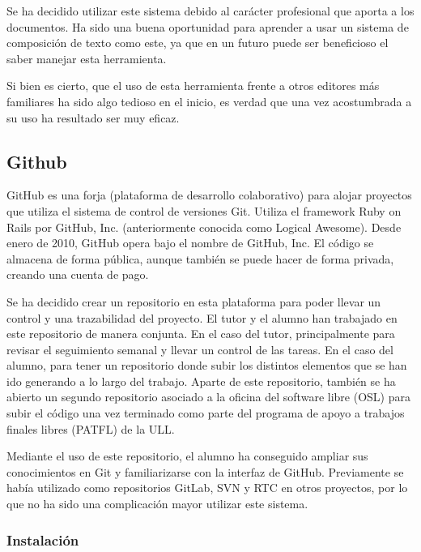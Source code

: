 Se ha decidido utilizar este sistema debido al carácter profesional que aporta a los documentos. Ha sido una buena oportunidad para aprender a usar un sistema de composición de texto como este, ya que en un futuro puede ser beneficioso el saber manejar esta herramienta. 

Si bien es cierto, que el uso de esta herramienta frente a otros editores más familiares ha sido algo tedioso en el inicio, es verdad que una vez acostumbrada a su uso ha resultado ser muy eficaz.

\vskip 0.5in

\subsection{Github}

GitHub \cite{URL::Github} es una forja (plataforma de desarrollo colaborativo) para alojar proyectos que utiliza el sistema de control de versiones Git. Utiliza el framework Ruby on Rails por GitHub, Inc.  (anteriormente conocida como Logical Awesome). Desde enero de 2010, GitHub opera bajo el nombre de GitHub, Inc. El código se almacena de forma pública, aunque también se puede hacer de forma privada, creando una cuenta de pago.

Se ha decidido crear un repositorio en esta plataforma para poder llevar un control y una trazabilidad del proyecto. El tutor y el alumno han trabajado en este repositorio de manera conjunta. En el caso del tutor, principalmente para revisar el seguimiento semanal y llevar un control de las tareas. En el caso del alumno, para tener un repositorio donde subir los distintos elementos que se han ido generando a lo largo del trabajo. Aparte de este repositorio, también se ha abierto un segundo repositorio \cite{URL::repositorioAplicacion} asociado a la oficina del software libre (OSL) para subir el código una vez terminado como parte del programa de apoyo a trabajos finales libres (PATFL) \cite{URL::PATFL} de la ULL.

Mediante el uso de este repositorio, el alumno ha conseguido ampliar sus conocimientos en Git y familiarizarse con la interfaz de GitHub. Previamente se había utilizado como repositorios GitLab, SVN y RTC en otros proyectos, por lo que no ha sido una complicación mayor utilizar este sistema.

    \subsubsection{Instalación}

